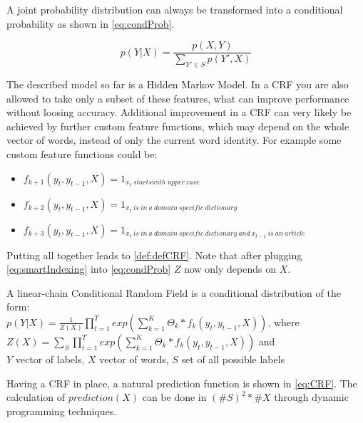 \documentclass[12pt, twoside]{report}
\begin{document}
A joint probability distribution can always be transformed into a conditional probability as shown in \cref{eq:condProb}.

\begin{equation}\label{eq:condProb}
p(Y|X) = \frac{p(X,Y)}{\sum_{Y'\in S}^{}p(Y', X)}
\end{equation}

The described model so far is a Hidden Markov Model. In a CRF you are also allowed to take only a subset of these features, what can improve performance without loosing accuracy. Additional improvement in a CRF can very likely be achieved by further custom feature functions, which may depend on the whole vector of words, instead of only the current word identity. For example some custom feature functions could be:

\begin{itemize}
\item $f_{k+1}(y_t, y_{t-1}, X) = 1_{x_t\ starts with\ upper\ case}$
\item $f_{k+2}(y_t, y_{t-1}, X) = 1_{x_t\ is\ in\ a\ domain\ specific\ dictionary}$
\item $f_{k+3}(y_t, y_{t-1}, X) = 1_{x_t\ is\ in\ a\ domain\ specific\ dictionary\ and\ x_{t-1}\ is\ an\ article}$
\end{itemize}

Putting all together leads to \cref{def:defCRF}. Note that after plugging \cref{eq:smartIndexing} into \cref{eq:condProb} $Z$ now only depends on $X$.

\begin{defn} \label{def:defCRF}
    A linear-chain Conditional Random Field is a conditional distribution of the form: \vspace*{0.5em} \\
    $p(Y|X) = \frac{1}{Z(X)}\prod_{t=1}^T exp(\sum_{k=1}^{K} \Theta_{k} * f_k(y_t, y_{t-1}, X))$, where \\
    \hspace*{2em}$Z(X) = \sum_{S}^{}\prod_{t=1}^T exp(\sum_{k=1}^{K} \Theta_{k} * f_k(y_t, y_{t-1}, X))$ and \\
    \hspace*{2em}$Y$ vector of labels, $X$ vector of words, $S$ set of all possible labels
\end{defn}

Having a CRF in place, a natural prediction function is shown in \cref{eq:CRF}. The calculation of $prediction(X)$ can be done in $(\#S)^2*\#X$ through dynamic programming techniques.
\end{document}
